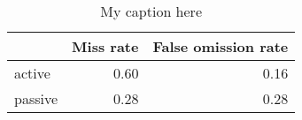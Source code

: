 \begin{table}[!ht]
\centering
\begin{tabular}{lrr}
\toprule
{} &  Miss rate &  False omission rate \\
\midrule
active  &       0.60 &                 0.16 \\
passive &       0.28 &                 0.28 \\
\bottomrule
\end{tabular}
\caption{My caption here}
\label{tab:VOICE-ocd-combined-errors}
\end{table}